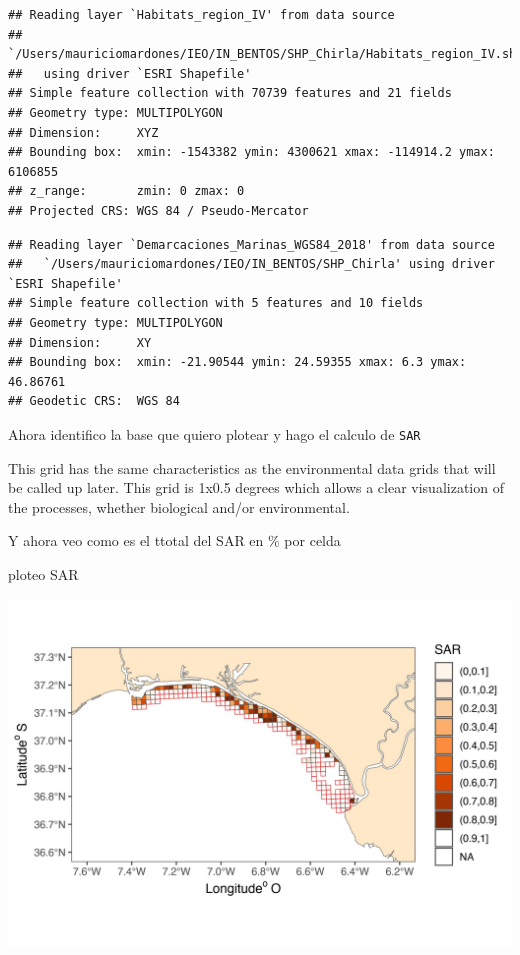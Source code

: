 \documentclass[
]{article}
\begin{document}
\begin{verbatim}
## Reading layer `Habitats_region_IV' from data source 
##   `/Users/mauriciomardones/IEO/IN_BENTOS/SHP_Chirla/Habitats_region_IV.shp' 
##   using driver `ESRI Shapefile'
## Simple feature collection with 70739 features and 21 fields
## Geometry type: MULTIPOLYGON
## Dimension:     XYZ
## Bounding box:  xmin: -1543382 ymin: 4300621 xmax: -114914.2 ymax: 6106855
## z_range:       zmin: 0 zmax: 0
## Projected CRS: WGS 84 / Pseudo-Mercator
\end{verbatim}

\begin{verbatim}
## Reading layer `Demarcaciones_Marinas_WGS84_2018' from data source 
##   `/Users/mauriciomardones/IEO/IN_BENTOS/SHP_Chirla' using driver `ESRI Shapefile'
## Simple feature collection with 5 features and 10 fields
## Geometry type: MULTIPOLYGON
## Dimension:     XY
## Bounding box:  xmin: -21.90544 ymin: 24.59355 xmax: 6.3 ymax: 46.86761
## Geodetic CRS:  WGS 84
\end{verbatim}

Ahora identifico la base que quiero plotear y hago el calculo de \texttt{SAR}

This grid has the same characteristics as the environmental data grids
that will be called up later. This grid is 1x0.5 degrees which allows a
clear visualization of the processes, whether biological and/or
environmental.

Y ahora veo como es el ttotal del SAR en \% por celda

ploteo SAR

\begin{center}\includegraphics{SAR_Method_files/figure-latex/unnamed-chunk-17-1} \end{center}
\end{document}
